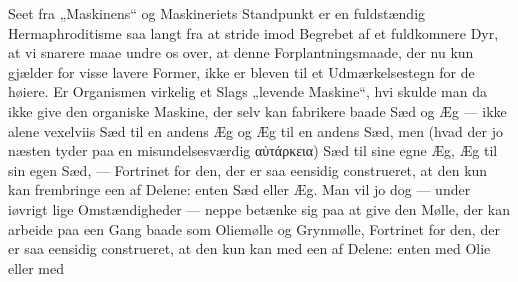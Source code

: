 \documentclass[12pt,a4paper]{book}
\begin{document}
Seet fra „Maskinens“ og Maskineriets Standpunkt er en fuldstændig
Hermaphroditisme saa langt fra at stride imod Begrebet af et fuldkomnere
Dyr, at vi snarere maae undre os over, at denne Forplantningsmaade, der
nu kun gjælder for visse lavere Former, ikke er bleven til et
Udmærkelsestegn for de høiere. Er Organismen virkelig et Slags „levende
Maskine“, hvi skulde man da ikke give den organiske Maskine, der selv kan
fabrikere baade Sæd og Æg --- ikke alene vexelviis Sæd til en andens Æg
og Æg
\setcounter{footnote}{0}
til en andens Sæd, men (hvad der jo næsten tyder paa en
misundelsesværdig αὐτάρκεια) Sæd til sine egne Æg, Æg til sin egen Sæd,
--- Fortrinet for den, der er saa eensidig construeret, at den kun kan
frembringe een af Delene: enten Sæd eller Æg. Man vil jo dog --- under
iøvrigt lige Omstændigheder --- neppe betænke sig paa at give den Mølle,
der kan arbeide paa een Gang baade som Oliemølle og Grynmølle, Fortrinet
for den, der er saa eensidig construeret, at den kun kan med een af
Delene: enten med Olie eller med
\end{document}
